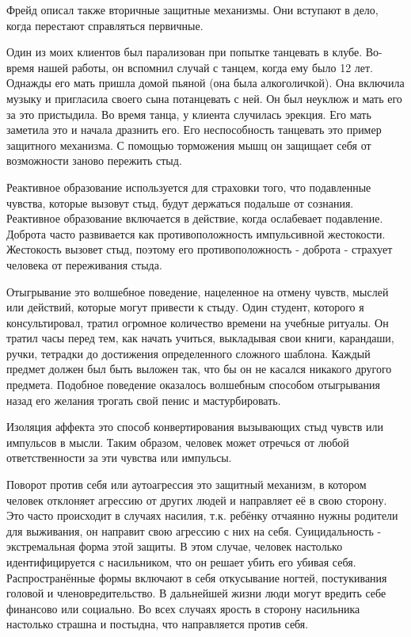 \documentclass[10pt, fleqn]{article}
\begin{document}

Фрейд описал также вторичные защитные механизмы. Они вступают в дело, когда перестают справляться первичные.


Один из моих клиентов был парализован при попытке танцевать в клубе. Во-время нашей работы, он вспомнил случай с танцем, когда ему было 12 лет.
Однажды его мать пришла домой пьяной (она была алкоголичкой). Она включила музыку и пригласила своего сына потанцевать с ней. Он был неуклюж и мать его за это пристыдила. Во время танца, у клиента случилась эрекция. Его мать заметила это и начала дразнить его.
Его неспособность танцевать это пример защитного механизма. С помощью торможения мышц он защищает себя от возможности заново пережить стыд.


Реактивное образование используется для страховки того, что подавленные чувства, которые вызовут стыд, будут держаться подальше от сознания. Реактивное образование включается в действие, когда ослабевает подавление. Доброта часто развивается как противоположность импульсивной жестокости. Жестокость вызовет стыд, поэтому его противоположность - доброта - страхует человека от переживания стыда.


Отыгрывание это волшебное поведение, нацеленное на отмену чувств, мыслей или действий, которые могут привести к стыду.
Один студент, которого я консультировал, тратил огромное количество времени на учебные ритуалы. Он тратил часы перед тем, как начать учиться, выкладывая свои книги, карандаши, ручки, тетрадки до достижения определенного сложного шаблона. Каждый предмет должен был быть выложен так, что бы он не касался никакого другого предмета.
Подобное поведение оказалось волшебным способом отыгрывания назад его желания трогать свой пенис и мастурбировать.


Изоляция аффекта это способ конвертирования вызывающих стыд чувств или импульсов в мысли. Таким образом, человек может отречься от любой ответственности за эти чувства или импульсы.


Поворот против себя или аутоагрессия это защитный механизм, в котором человек отклоняет агрессию от других людей и направляет её в свою сторону. Это часто происходит в случаях насилия, т.к. ребёнку отчаянно нужны родители для выживания, он направит свою агрессию с них на себя. Суицидальность - экстремальная форма этой защиты. В этом случае, человек настолько идентифицируется с насильником, что он решает убить его убивая себя.
Распространённые формы включают в себя откусывание ногтей, постукивания головой и членовредительство. В дальнейшей жизни люди могут вредить себе финансово или социально. Во всех случаях ярость в сторону насильника настолько страшна и постыдна, что направляется против себя.
\end{document}
